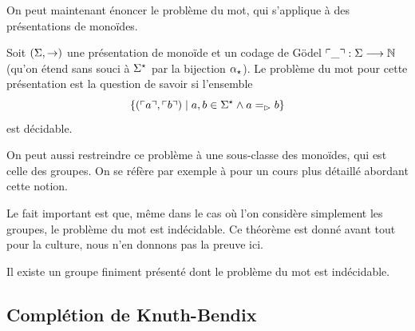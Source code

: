 On peut maintenant énoncer le problème du mot, qui s'applique à des
présentations de monoïdes.

\begin{definition}
  Soit $(\Sigma,\mathrel{\to})$ une présentation de monoïde et un codage de Gödel
  $\ulcorner\mathord{\_}\urcorner : \displaystyle \Sigma \longrightarrow \mathbb N$ (qu'on étend sans souci à
  $\Sigma^{\star}$ par la bijection $\alpha_{\star}$). Le problème du mot pour cette
  présentation est la question de savoir si l'ensemble
  \[\left\{ (\ulcorner a\urcorner,\ulcorner b\urcorner) \;\middle\vert\; a,b \in \Sigma^{\star}\land a\mathrel{=_{\mathord{\mathrel{\rhd}}}} b \right\}\]
  est décidable.
\end{definition}

On peut aussi restreindre ce problème à une sous-classe des monoïdes, qui
est celle des groupes. On se réfère par exemple à \cite{Berhuy2025}
pour un cours plus détaillé abordant cette notion.

Le fait important est que, même dans le cas où l'on considère simplement
les groupes, le problème du mot est indécidable. Ce théorème est donné
avant tout pour la culture, nous n'en donnons pas la preuve ici.

\begin{theorem}
  Il existe un groupe finiment présenté dont le problème du mot est
  indécidable.
\end{theorem}

\subsection{Complétion de Knuth-Bendix}

